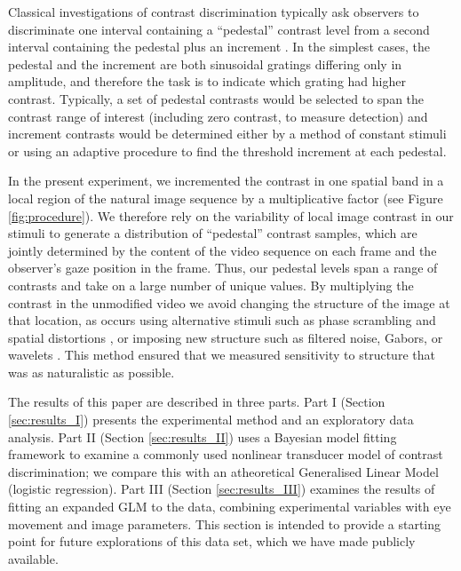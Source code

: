 \documentclass[11pt,a4paper]{article}
\begin{document}
Classical investigations of contrast discrimination typically ask observers to discriminate one interval containing a ``pedestal'' contrast level from a second interval containing the pedestal plus an increment \citep{Nachmias1974,Legge1980}.
In the simplest cases, the pedestal and the increment are both sinusoidal gratings differing only in amplitude, and therefore the task is to indicate which grating had higher contrast.
Typically, a set of pedestal contrasts would be selected to span the contrast range of interest (including zero contrast, to measure detection) and increment contrasts would be determined either by a method of constant stimuli or using an adaptive procedure to find the threshold increment at each pedestal.

In the present experiment, we incremented the contrast in one spatial band in a local region of the natural image sequence by a multiplicative factor (see Figure \ref{fig:procedure}).
We therefore rely on the variability of local image contrast \citep[see e.g.][Figure 6]{Bex2009} in our stimuli to generate a distribution of ``pedestal'' contrast samples, which are jointly determined by the content of the video sequence on each frame and the observer's gaze position in the frame.
Thus, our pedestal levels span a range of contrasts and take on a large number of unique values.
By multiplying the contrast in the unmodified video we avoid changing the structure of the image at that location, as occurs using alternative stimuli such as phase scrambling \citep{OpLi81,Thomson1999,Vogels1999,BeMa02,SaSi04,WiBrGe06} and spatial distortions \citep{Bex2010,Rovamo1997}, or imposing new structure such as filtered noise, Gabors, or wavelets \citep[e.g.][]{Caelli1986,Eckstein1997,Bex2009,Chandler2009,Alam2014}. 
This method ensured that we measured sensitivity to structure that was as naturalistic as possible.

The results of this paper are described in three parts.
Part I (Section \ref{sec:results_I}) presents the experimental method and an exploratory data analysis.
Part II (Section \ref{sec:results_II}) uses a Bayesian model fitting framework to examine a commonly used nonlinear transducer model of contrast discrimination; we compare this with an atheoretical Generalised Linear Model (logistic regression).
Part III (Section \ref{sec:results_III}) examines the results of fitting an expanded GLM to the data, combining experimental variables with eye movement and image parameters.
This section is intended to provide a starting point for future explorations of this data set, which we have made publicly available.
\end{document}
